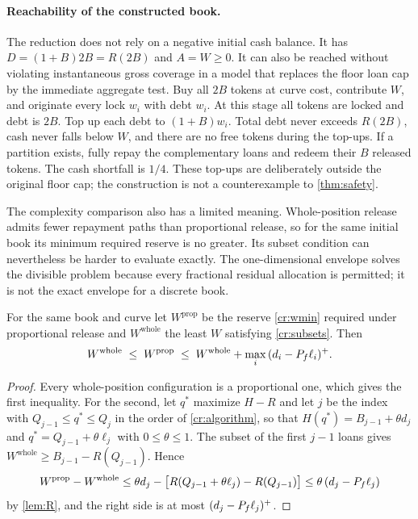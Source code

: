 \paragraph{Reachability of the constructed book.}
The reduction does not rely on a negative initial cash balance. It has $D=(1+B)2B=R(2B)$ and $A=W\ge0$. It can also be reached without violating instantaneous gross coverage in a model that replaces the floor loan cap by the immediate aggregate test. Buy all $2B$ tokens at curve cost, contribute $W$, and originate every lock $w_i$ with debt $w_i$. At this stage all tokens are locked and debt is $2B$. Top up each debt to $(1+B)w_i$. Total debt never exceeds $R(2B)$, cash never falls below $W$, and there are no free tokens during the top-ups. If a partition exists, fully repay the complementary loans and redeem their $B$ released tokens. The cash shortfall is $1/4$. These top-ups are deliberately outside the original floor cap; the construction is not a counterexample to \cref{thm:safety}.

The complexity comparison also has a limited meaning. Whole-position release admits fewer repayment paths than proportional release, so for the same initial book its minimum required reserve is no greater. Its subset condition can nevertheless be harder to evaluate exactly. The one-dimensional envelope solves the divisible problem because every fractional residual allocation is permitted; it is not the exact envelope for a discrete book.

\begin{proposition}\label{cr:guardbound}
For the same book and curve let $W^{\mathrm{prop}}$ be the reserve \eqref{cr:wmin} required under proportional release and $W^{\mathrm{whole}}$ the least $W$ satisfying \eqref{cr:subsets}. Then
\[
W^{\mathrm{whole}}\;\le\;W^{\mathrm{prop}}\;\le\;W^{\mathrm{whole}}+\max_i\,(d_i-P_f\ell_i)^+ .
\]
\end{proposition}
\begin{proof}
Every whole-position configuration is a proportional one, which gives the first inequality. For the second, let $q^\ast$ maximize $H-R$ and let $j$ be the index with $Q_{j-1}\le q^\ast\le Q_j$ in the order of \cref{cr:algorithm}, so that $H(q^\ast)=B_{j-1}+\theta d_j$ and $q^\ast=Q_{j-1}+\theta\ell_j$ with $0\le\theta\le1$. The subset of the first $j-1$ loans gives $W^{\mathrm{whole}}\ge B_{j-1}-R(Q_{j-1})$. Hence
\[
W^{\mathrm{prop}}-W^{\mathrm{whole}}\le\theta d_j-\bigl[R(Q_{j-1}+\theta\ell_j)-R(Q_{j-1})\bigr]\le\theta\,(d_j-P_f\ell_j)
\]
by \cref{lem:R}, and the right side is at most $(d_j-P_f\ell_j)^+$.
\end{proof}

